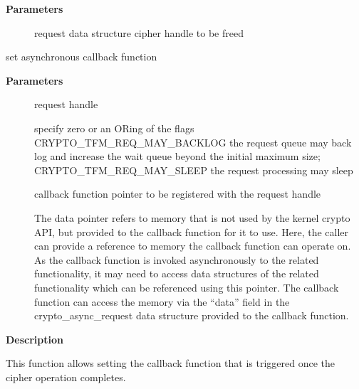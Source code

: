 \documentclass[a4paper,8pt,english]{sphinxmanual}
\begin{document}
\textbf{Parameters}
\begin{description}
\item[{}] \leavevmode
request data structure cipher handle to be freed

\end{description}

\begin{fulllineitems}
\label{crypto/api-skcipher:c.ablkcipher_request_set_callback}
set asynchronous callback function

\end{fulllineitems}


\textbf{Parameters}
\begin{description}
\item[{}] \leavevmode
request handle

\item[{}] \leavevmode
specify zero or an ORing of the flags
CRYPTO\_TFM\_REQ\_MAY\_BACKLOG the request queue may back log and
increase the wait queue beyond the initial maximum size;
CRYPTO\_TFM\_REQ\_MAY\_SLEEP the request processing may sleep

\item[{}] \leavevmode
callback function pointer to be registered with the request handle

\item[{}] \leavevmode
The data pointer refers to memory that is not used by the kernel
crypto API, but provided to the callback function for it to use. Here,
the caller can provide a reference to memory the callback function can
operate on. As the callback function is invoked asynchronously to the
related functionality, it may need to access data structures of the
related functionality which can be referenced using this pointer. The
callback function can access the memory via the ``data'' field in the
crypto\_async\_request data structure provided to the callback function.

\end{description}

\textbf{Description}

This function allows setting the callback function that is triggered once the
cipher operation completes.
\end{document}
